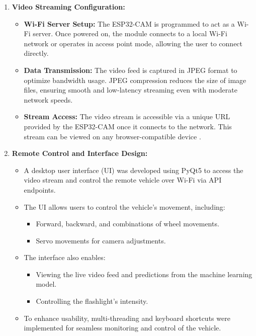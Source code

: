 \documentclass[12pt,a4paper]{report}
\begin{document}
\begin{enumerate}
    
\item \textbf{Video Streaming Configuration:}
\begin{itemize}
    \item \textbf{Wi-Fi Server Setup:} The ESP32-CAM is programmed to act as a Wi-Fi server. Once powered on, the module connects to a local Wi-Fi network or operates in access point mode, allowing the user to connect directly.
    \item \textbf{Data Transmission:} The video feed is captured in JPEG format to optimize bandwidth usage. JPEG compression reduces the size of image files, ensuring smooth and low-latency streaming even with moderate network speeds.
    \item \textbf{Stream Access:} The video stream is accessible via a unique URL provided by the ESP32-CAM once it connects to the network. This stream can be viewed on any browser-compatible device \cite{iot}.
\end{itemize}

    
\item \textbf{Remote Control and Interface Design:}
\begin{itemize}
    \item A desktop user interface (UI) was developed using PyQt5 to access the video stream and control the remote vehicle over Wi-Fi via API endpoints.
    \item The UI allows users to control the vehicle's movement, including:
    \begin{itemize}
        \item Forward, backward, and combinations of wheel movements.
        \item Servo movements for camera adjustments.
    \end{itemize}
    \item The interface also enables:
    \begin{itemize}
        \item Viewing the live video feed and predictions from the machine learning model.
        \item Controlling the flashlight's intensity.
    \end{itemize}
    \item To enhance usability, multi-threading and keyboard shortcuts were implemented for seamless monitoring and control of the vehicle.
\end{itemize}


\end{enumerate}
\end{document}
